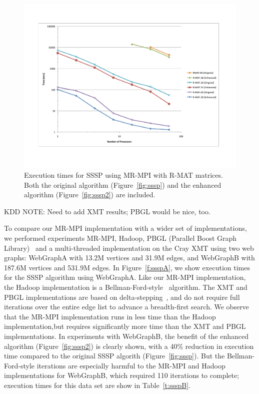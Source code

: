 \begin{figure}[h!]
\includegraphics[width=\textwidth]{fig_sssp.pdf}
\caption{Execution times for SSSP using MR-MPI with R-MAT matrices.  
Both the original algorithm (Figure~\ref{fig:sssp}) and the enhanced 
algorithm (Figure~\ref{fig:sssp2}) are included.}
\label{f:sssp}
\end{figure}

KDD NOTE:  Need to add XMT results; PBGL would be nice, too.

To compare our MR-MPI implementation with a wider set of implementations,
we performed experiments MR-MPI, Hadoop, PBGL (Parallel
Boost Graph Library)~\cite{PBGL} and a multi-threaded implementation on the
Cray XMT using two web graphs: {WebGraphA} with 13.2M
vertices and 31.9M edges, and {WebGraphB} with 187.6M vertices and 531.9M edges.
In Figure~\ref{f:ssspA}, we show execution times for the SSSP algorithm
using {WebGraphA}.   Like our MR-MPI implementation, the Hadoop 
implementation is a Bellman-Ford-style~\cite{Bellman58,Ford62}  algorithm.  
The XMT and PBGL implementations are based on 
delta-stepping~\cite{MeyerSanders98}, and do not require full iterations
over the entire edge list to advance a breadth-first search.  
We observe that the MR-MPI
implementation runs in less time than the Hadoop implementation,but requires
significantly more time than the XMT and PBGL implementations.  
In experiments with {WebGraphB},
the benefit of the enhanced algorithm (Figure~\ref{fig:sssp2}) is clearly
shown, with a 40\% reduction in execution time compared to the original
SSSP algorith (Figure~\ref{fig:sssp}).
But the Bellman-Ford-style iterations are especially harmful to the MR-MPI and
Hadoop implementations for {WebGraphB}, which required 110 iterations to 
complete; execution times for this data set are show in Table~\ref{t:ssspB}.

